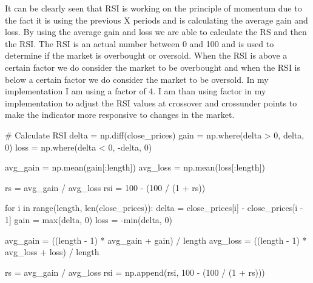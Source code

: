 \documentclass{imc-inf}
\begin{document}
	
	It can be clearly seen that RSI \cite{rsi_implement}is working on the principle of momentum due to the fact it is using the previous X periods and is calculating the average gain and loss.
	By using the average gain and loss we are able to calculate the RS and then the RSI. The RSI is an actual number between 0 and 100 and is used to determine if the market is overbought or oversold.
	When the RSI is above a certain factor we do consider the market to be overbought and when the RSI is below a certain factor we do consider the market to be oversold.
	In my implementation I am using a factor of 4. I am than using factor in my implementation to adjust the RSI values at crossover and crossunder points to make the indicator
	more responsive to changes in the market.
	
	
	
	
	\begin{code}[language=Python, caption={RSI Implementation}] 
		# Calculate RSI
		delta = np.diff(close_prices)
		gain = np.where(delta > 0, delta, 0)
		loss = np.where(delta < 0, -delta, 0)
		
		avg_gain = np.mean(gain[:length])
		avg_loss = np.mean(loss[:length])
		
		rs = avg_gain / avg_loss
		rsi = 100 - (100 / (1 + rs))
		
		for i in range(length, len(close_prices)):
		delta = close_prices[i] - close_prices[i - 1]
		gain = max(delta, 0)
		loss = -min(delta, 0)
		
		avg_gain = ((length - 1) * avg_gain + gain) / length
		avg_loss = ((length - 1) * avg_loss + loss) / length
		
		rs = avg_gain / avg_loss
		rsi = np.append(rsi, 100 - (100 / (1 + rs)))
		
	\end{code}
	
\end{document}
